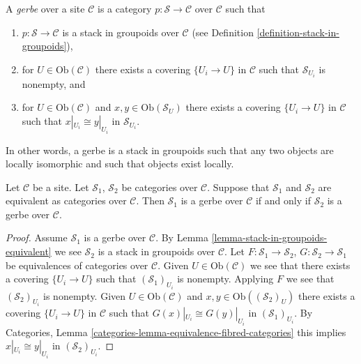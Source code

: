 \begin{definition}
\label{definition-gerbe}
A {\it gerbe} over a site $\mathcal{C}$ is a category
$p : \mathcal{S} \to \mathcal{C}$ over $\mathcal{C}$ such that
\begin{enumerate}
\item $p : \mathcal{S} \to \mathcal{C}$ is a stack
in groupoids over $\mathcal{C}$ (see
Definition \ref{definition-stack-in-groupoids}),
\item for $U \in \text{Ob}(\mathcal{C})$ there exists
a covering $\{U_i \to U\}$ in $\mathcal{C}$ such that
$\mathcal{S}_{U_i}$ is nonempty, and
\item for $U \in \text{Ob}(\mathcal{C})$ and
$x, y \in \text{Ob}(\mathcal{S}_U)$ there exists
a covering $\{U_i \to U\}$ in $\mathcal{C}$ such that
$x|_{U_i} \cong y|_{U_i}$ in $\mathcal{S}_{U_i}$.
\end{enumerate}
\end{definition}

\noindent
In other words, a gerbe is a stack in groupoids such that any two objects
are locally isomorphic and such that objects exist locally.

\begin{lemma}
\label{lemma-gerbe-equivalent}
Let $\mathcal{C}$ be a site.
Let $\mathcal{S}_1$, $\mathcal{S}_2$ be categories over $\mathcal{C}$.
Suppose that $\mathcal{S}_1$ and $\mathcal{S}_2$ are equivalent
as categories over $\mathcal{C}$.
Then $\mathcal{S}_1$ is a gerbe over $\mathcal{C}$ if and only if
$\mathcal{S}_2$ is a gerbe over $\mathcal{C}$.
\end{lemma}

\begin{proof}
Assume $\mathcal{S}_1$ is a gerbe over $\mathcal{C}$. By
Lemma \ref{lemma-stack-in-groupoids-equivalent}
we see $\mathcal{S}_2$ is a stack in groupoids over $\mathcal{C}$.
Let $F : \mathcal{S}_1 \to \mathcal{S}_2$,
$G : \mathcal{S}_2 \to \mathcal{S}_1$ be equivalences of categories over
$\mathcal{C}$. Given $U \in \text{Ob}(\mathcal{C})$ we see that there exists
a covering $\{U_i \to U\}$ such that $(\mathcal{S}_1)_{U_i}$ is
nonempty. Applying $F$ we see that $(\mathcal{S}_2)_{U_i}$ is nonempty.
Given $U \in \text{Ob}(\mathcal{C})$ and
$x, y \in \text{Ob}((\mathcal{S}_2)_U)$ there exists
a covering $\{U_i \to U\}$ in $\mathcal{C}$ such that
$G(x)|_{U_i} \cong G(y)|_{U_i}$ in $(\mathcal{S}_1)_{U_i}$. By
Categories, Lemma \ref{categories-lemma-equivalence-fibred-categories}
this implies $x|_{U_i} \cong y|_{U_i}$ in $(\mathcal{S}_2)_{U_i}$.
\end{proof}


